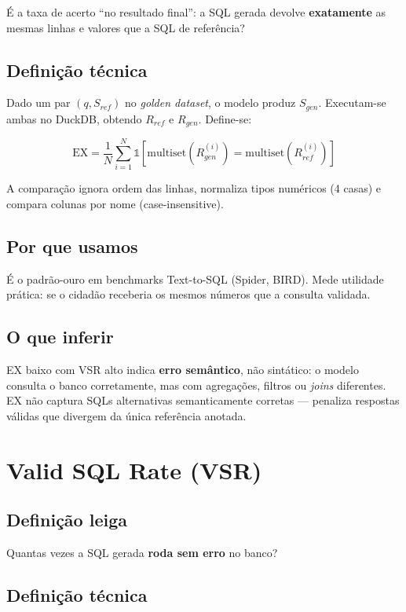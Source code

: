 É a taxa de acerto ``no resultado final'': a SQL gerada devolve \textbf{exatamente} as mesmas linhas e valores que a SQL de referência?

\subsection{Definição técnica}

Dado um par $(q, S_{ref})$ no \textit{golden dataset}, o modelo produz $S_{gen}$. Executam-se ambas no DuckDB, obtendo $R_{ref}$ e $R_{gen}$. Define-se:

\[
\text{EX} = \frac{1}{N} \sum_{i=1}^{N} \mathbb{1}\left[ \text{multiset}(R_{gen}^{(i)}) = \text{multiset}(R_{ref}^{(i)}) \right]
\]

A comparação ignora ordem das linhas, normaliza tipos numéricos (4 casas) e compara colunas por nome (case-insensitive).

\subsection{Por que usamos}

É o padrão-ouro em benchmarks Text-to-SQL (Spider, BIRD). Mede utilidade prática: se o cidadão receberia os mesmos números que a consulta validada.

\subsection{O que inferir}

EX baixo com VSR alto indica \textbf{erro semântico}, não sintático: o modelo consulta o banco corretamente, mas com agregações, filtros ou \textit{joins} diferentes. EX não captura SQLs alternativas semanticamente corretas --- penaliza respostas válidas que divergem da única referência anotada.

\section{Valid SQL Rate (VSR)}

\subsection{Definição leiga}

Quantas vezes a SQL gerada \textbf{roda sem erro} no banco?

\subsection{Definição técnica}

